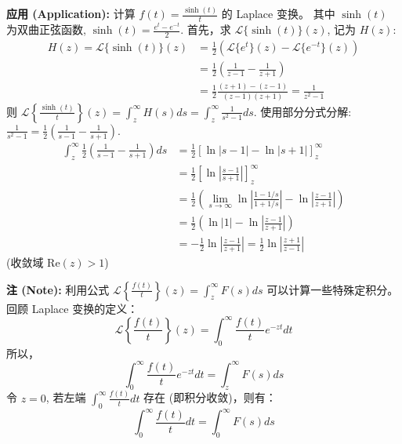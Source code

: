 \documentclass[linespread=1.5,openany]{book}%
\def\diff{d}%
\theoremstyle{plain}
\newcommand{\diff}{\mathop{}\!\mathrm{d}}  %
\begin{document}
{{{{{{								\noindent\textbf{应用 (Application):} 计算 $f(t)=\frac{\sinh(t)}{t}$ 的 Laplace 变换。
								其中 $\sinh(t)$ 为双曲正弦函数, $\sinh(t) = \frac{e^t - e^{-t}}{2}$.
								首先，求 $\mathcal{L}\{\sinh(t)\}(z)$, 记为 $H(z)$:
								\begin{align*}
									H(z) = \mathcal{L}\{\sinh(t)\}(z) &= \frac{1}{2} \left( \mathcal{L}\{e^t\}(z) - \mathcal{L}\{e^{-t}\}(z) \right) \\[6pt]
									&= \frac{1}{2} \left( \frac{1}{z-1} - \frac{1}{z+1} \right) \\[6pt]
									&= \frac{1}{2} \frac{(z+1) - (z-1)}{(z-1)(z+1)} = \frac{1}{z^2-1}
								\end{align*}
								则 $\mathcal{L}\left\{\frac{\sinh(t)}{t}\right\}(z) = \int_{z}^{\infty} H(s) \diff s = \int_{z}^{\infty} \frac{1}{s^2-1} \diff s$.
								使用部分分式分解: $\frac{1}{s^2-1} = \frac{1}{2}\left(\frac{1}{s-1} - \frac{1}{s+1}\right)$.
								\begin{align*}
									\int_{z}^{\infty} \frac{1}{2}\left(\frac{1}{s-1} - \frac{1}{s+1}\right) \diff s &= \frac{1}{2} \left[ \ln|s-1| - \ln|s+1| \right]_{z}^{\infty} \\[6pt]
									&= \frac{1}{2} \left[ \ln\left|\frac{s-1}{s+1}\right| \right]_{z}^{\infty} \\[6pt]
									&= \frac{1}{2} \left( \lim_{s\to\infty} \ln\left|\frac{1-1/s}{1+1/s}\right| - \ln\left|\frac{z-1}{z+1}\right| \right) \\[6pt]
									&= \frac{1}{2} \left( \ln|1| - \ln\left|\frac{z-1}{z+1}\right| \right) \\[6pt]
									&= -\frac{1}{2} \ln\left|\frac{z-1}{z+1}\right| = \frac{1}{2} \ln\left|\frac{z+1}{z-1}\right|
								\end{align*}
								(收敛域 $\text{Re}(z)>1$)
								
								\textbf{注 (Note):} 利用公式 $\mathcal{L}\left\{\frac{f(t)}{t}\right\}(z) = \int_{z}^{\infty} F(s) \diff s$ 可以计算一些特殊定积分。
								回顾 Laplace 变换的定义：
								\[ \mathcal{L}\left\{\frac{f(t)}{t}\right\}(z) = \int_0^\infty \frac{f(t)}{t} e^{-zt} \diff t \]
								所以，
								\[ \int_0^\infty \frac{f(t)}{t} e^{-zt} \diff t = \int_{z}^{\infty} F(s) \diff s \]
								令 $z=0$, 若左端 $\int_0^\infty \frac{f(t)}{t} \diff t$ 存在 (即积分收敛)，则有：
								\begin{equation} \label{eq:L15_definite_integral_from_laplace}
									\int_0^\infty \frac{f(t)}{t} \diff t = \int_{0}^{\infty} F(s) \diff s
								\end{equation}
								
}}}}}}
\end{document}
